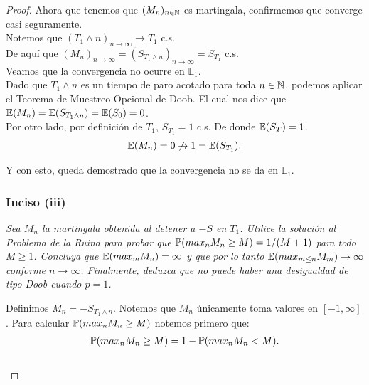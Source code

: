 \begin{proof}
		Ahora que tenemos que ${(M_n)_{n \in \mathbb{N}}}$ es martingala, confirmemos que converge casi seguramente.\\
		
		Notemos que ${(T_1 \wedge n)_{n \rightarrow \infty} \rightarrow T_1}$ c.s.\\
		
		De aquí que ${(M_n)_{n \rightarrow \infty} = (S_{T_1 \wedge n})_{n \rightarrow \infty} = S_{T_1}}$ c.s. \\				
		
		Veamos que la convergencia no ocurre en ${\mathbb{L}_1}$. \\
					
		Dado que ${T_1 \wedge n}$ es un tiempo de paro acotado para toda ${n \in \mathbb{N}}$,
		podemos aplicar el Teorema de Muestreo Opcional de 	Doob. 
		El cual nos dice que ${\mathbb{E}(M_n) = \mathbb{E}(S_{T_1 \wedge n}) = \mathbb{E}(S_0) = 0}$.\\
		
		Por otro lado, por definición de ${T_1}$, ${S_{T_1} = 1}$ c.s.	De donde ${\mathbb{E}(S_T) = 1}$.\\
		
		\begin{align}
			\mathbb{E}(M_n) = 0 \not\rightarrow 1 = \mathbb{E}(S_{T_1}).
		\end{align}			
		
		Y con esto, queda demostrado que la convergencia no se da en ${\mathbb{L}_1}$.\\
		
	\subsubsection{Inciso (iii)}		
	\emph{
		Sea ${M_n}$ la martingala obtenida al detener a ${-S}$ en ${T_1}$. Utilice la solución al
		Problema de la Ruina para probar que ${\mathbb{P}(max_n M_n \geq M) = 1/(M+1)}$ para todo ${M \geq 1}$. Concluya que
		${\mathbb{E}(max_m M_n) = \infty}$ y que por lo tanto ${\mathbb{E}(max_{m\leq n} M_m) \rightarrow \infty}$ conforme 
		${n \rightarrow \infty}$. Finalmente, deduzca que no puede haber una desigualdad de tipo Doob cuando ${p=1}$.\\
	}	

		Definimos ${M_n = -S_{T_1 \wedge n}}$. Notemos que ${M_n}$ únicamente toma valores en ${[-1, \infty]}$.
		Para calcular ${\mathbb{P}(max_n M_n \geq M)}$ notemos primero que:
		\begin{align}
			\mathbb{P}(max_n M_n \geq M) = 1 - \mathbb{P}(max_n M_n < M).
		\end{align}\\
		

\end{proof}
